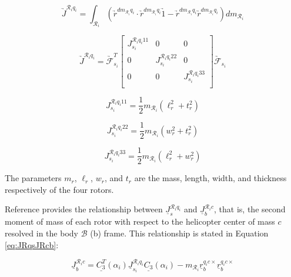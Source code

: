 \documentclass[journal]{IEEEtran}
\begin{document}
\begin{equation}
	\underrightarrow{J}^{\mathcal{R}_iq_i}=\int_{\mathcal{R}_i}^{}
	(\underrightarrow{r}^{dm_{\mathcal{R}_i}q_i}\cdot\underrightarrow{r}^{dm_{\mathcal{R}_i}q_i}\underrightarrow{1}- \underrightarrow{r}^{dm_{\mathcal{R}_i}q_i}\underrightarrow{r}^{dm_{\mathcal{R}_i}q_i})dm_{\mathcal{R}_i}
	\label{eq:Rsecmoment1}
\end{equation} 

\begin{equation}
	\underrightarrow{J}^{\mathcal{R}_iq_i}=\underrightarrow{\mathcal{F}}^T_{s_i}\left[ \begin{array}{ccc}
					J^{\mathcal{R}_iq_i11}_{s_i} & 0 & 0\\
					0 & J^{\mathcal{R}_iq_i22}_{s_i} & 0\\
					0 & 0 & J^{\mathcal{R}_iq_i33}_{s_i}\\
					\end{array} \right]\underrightarrow{\mathcal{F}}_{s_i}
	\label{eq:Rsecmoment2}
\end{equation} 

\begin{equation}
	J^{\mathcal{R}_iq_i11}_{s_i}=\frac{1}{2}m_{\mathcal{R}_i}(\ell_r^2+t_r^2)
	\label{eq:Rsecmoment3}
\end{equation} 

\begin{equation}
	J^{\mathcal{R}_iq_i22}_{s_i}=\frac{1}{2}m_{\mathcal{R}_i}(w_r^2+t_r^2)
	\label{eq:Rsecmoment4}
\end{equation} 

\begin{equation}
	J^{\mathcal{R}_iq_i33}_{s_i}=\frac{1}{2}m_{\mathcal{R}_i}(\ell_r^2+w_r^2)
	\label{eq:Rsecmoment5}
\end{equation} 

The parameters $m_r$, $\ell_r$, $w_r$, and $t_r$ are the mass, length, width, and thickness respectively of the four rotors.

Reference \cite{dual_spin} provides the relationship between $\underline{J}^{\mathcal{R}_iq_i}_s$ and $\underline{J}^{\mathcal{R}_ic}_b$, that is, the second moment of mass of each rotor with respect to the helicopter center of mass $c$ resolved in the body $\mathcal{B}$ (b) frame. This relationship is stated in Equation \ref{eq:JRqsJRcb}:

\begin{equation}
\underline{J}^{\mathcal{R}_ic}_b=\underline{C^T_3}(\alpha_i)\underline{J}^{\mathcal{R}_iq_i}_{s_i}\underline{C_3}(\alpha_i)-m_{\mathcal{R}_i}\underline{r}^{q_ic\times}_b\underline{r}^{q_ic\times}_b 
\label{eq:JRqsJRcb}
\end{equation}
\end{document}
